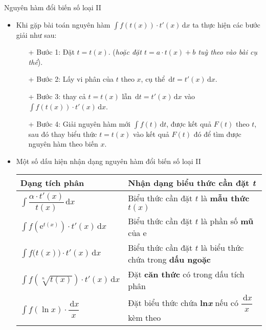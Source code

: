\begin{dang}{Nguyên hàm đổi biến số loại II}
	\begin{itemize}
		\item Khi gặp bài toán nguyên hàm $\displaystyle\int{f\left(t(x) \right)\cdot t'(x)\mathrm{\,d}x}$ ta thực hiện các bước giải như sau:
		\begin{itemize}
			\item[+] Bước 1: Đặt $t=t(x)$. (\textit{hoặc đặt $t=a\cdot t(x)+b$ tuỳ theo vào bài cụ thể}).
			\item[+] Bước 2: Lấy vi phân của $t$ theo $x$, cụ thể $\mathrm{\,d}t=t'(x)\mathrm{\,d}x$.
			\item[+] Bước 3: thay cả $t=t(x)$ lẫn $\mathrm{\,d}t=t'(x)\mathrm{\,d}x$ vào $\displaystyle\int{f\left(t(x) \right)\cdot t'(x)\mathrm{\,d}x}$.
			\item[+] Bước 4: Giải nguyên hàm mới $\displaystyle\int{f(t)\mathrm{\,d}t}$, được kết quả $F(t)$ theo $t$, sau đó thay biểu thức $t=t(x)$ vào kết quả $F(t)$ đó để tìm được nguyên hàm theo biến $x$.
		\end{itemize}
		\item Một số dấu hiện nhận dạng nguyên hàm đổi biến số loại II
		\renewcommand\arraystretch{2.1}
		\begin{longtable}{|p{3.9cm}|p{10cm}|}
			\hline
			\centerline{\textbf{Dạng tích phân}}&\centerline{\textbf{Nhận dạng biểu thức cần đặt \textit{t}}}\\
			\hline
			$\displaystyle\int{\dfrac{\alpha\cdot t'(x)}{t(x)}\mathrm{\,d}x}$&Biểu thức cần đặt $t$ là \textbf{mẫu thức} $t(x)$\\
			\hline
			$\displaystyle\int{f\left(\mathrm{e}^{t(x)} \right)\cdot t'(x)\mathrm{\,d}x}$&Biểu thức cần đặt $t$ là phần số \textbf{mũ} của $\mathrm{e}$\\
			\hline
			$\displaystyle\int{f\big(t(x) \big)\cdot t'(x)\mathrm{\,d}x}$&Biểu thức cần đặt $t$ là biểu thức chứa trong \textbf{dấu ngoặc}\\
			\hline
			$\displaystyle\int{f\left(\sqrt[n]{t(x)} \right)\cdot t'(x)\mathrm{\,d}x}$&Đặt \textbf{căn thức} có trong dấu tích phân\\
			\hline
			$\displaystyle\int{f\left(\ln x \right)\cdot\dfrac{\mathrm{\,d}x}{x}}$&Đặt biểu thức chứa \textbf{ln\textit{x}} nếu có $\dfrac{\mathrm{\,d}x}{x}$ kèm theo\\
			\hline
		\end{longtable}\vspace{-0.1cm}
	\end{itemize}
\end{dang}
